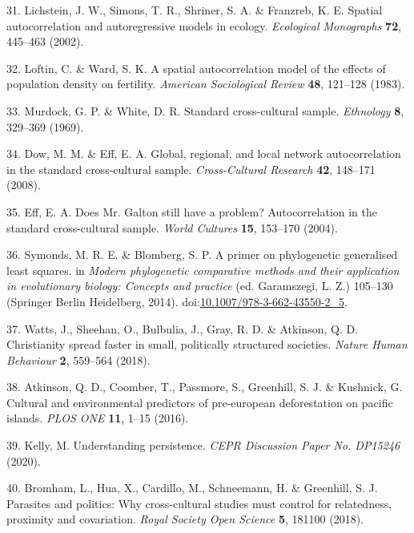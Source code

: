 \documentclass[english,man,floatsintext]{apa6}
\begin{document}
\leavevmode\hypertarget{ref-Lichstein2002}{}%
31. Lichstein, J. W., Simons, T. R., Shriner, S. A. \& Franzreb, K. E. Spatial autocorrelation and autoregressive models in ecology. \emph{Ecological Monographs} \textbf{72}, 445--463 (2002).

\leavevmode\hypertarget{ref-Loftin1983}{}%
32. Loftin, C. \& Ward, S. K. A spatial autocorrelation model of the effects of population density on fertility. \emph{American Sociological Review} \textbf{48}, 121--128 (1983).

\leavevmode\hypertarget{ref-Murdock1969}{}%
33. Murdock, G. P. \& White, D. R. Standard cross-cultural sample. \emph{Ethnology} \textbf{8}, 329--369 (1969).

\leavevmode\hypertarget{ref-Dow2008}{}%
34. Dow, M. M. \& Eff, E. A. Global, regional, and local network autocorrelation in the standard cross-cultural sample. \emph{Cross-Cultural Research} \textbf{42}, 148--171 (2008).

\leavevmode\hypertarget{ref-Eff2004}{}%
35. Eff, E. A. Does Mr. Galton still have a problem? Autocorrelation in the standard cross-cultural sample. \emph{World Cultures} \textbf{15}, 153--170 (2004).

\leavevmode\hypertarget{ref-Symonds2014}{}%
36. Symonds, M. R. E. \& Blomberg, S. P. A primer on phylogenetic generalised least squares. in \emph{Modern phylogenetic comparative methods and their application in evolutionary biology: Concepts and practice} (ed. Garamszegi, L. Z.) 105--130 (Springer Berlin Heidelberg, 2014). doi:\href{https://doi.org/10.1007/978-3-662-43550-2_5}{10.1007/978-3-662-43550-2\_5}.

\leavevmode\hypertarget{ref-Watts2018}{}%
37. Watts, J., Sheehan, O., Bulbulia, J., Gray, R. D. \& Atkinson, Q. D. Christianity spread faster in small, politically structured societies. \emph{Nature Human Behaviour} \textbf{2}, 559--564 (2018).

\leavevmode\hypertarget{ref-Atkinson2016}{}%
38. Atkinson, Q. D., Coomber, T., Passmore, S., Greenhill, S. J. \& Kushnick, G. Cultural and environmental predictors of pre-european deforestation on pacific islands. \emph{PLOS ONE} \textbf{11}, 1--15 (2016).

\leavevmode\hypertarget{ref-Kelly2020}{}%
39. Kelly, M. Understanding persistence. \emph{CEPR Discussion Paper No. DP15246} (2020).

\leavevmode\hypertarget{ref-Bromham2018}{}%
40. Bromham, L., Hua, X., Cardillo, M., Schneemann, H. \& Greenhill, S. J. Parasites and politics: Why cross-cultural studies must control for relatedness, proximity and covariation. \emph{Royal Society Open Science} \textbf{5}, 181100 (2018).
\end{document}
